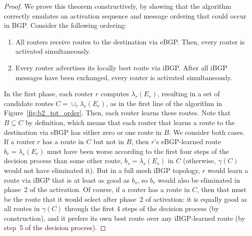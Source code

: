 \vspace*{0.1in}
\begin{proof}
We prove this theorem constructively, by showing that the algorithm
correctly emulates an activation sequence and message ordering that
could occur in BGP.  Consider the following ordering:
\begin{enumerate}
\itemsep=-1pt
\item All routers receive routes to the destination via eBGP.
Then, every router is activated simultaneously.
\item Every router advertises its locally best route via iBGP.  
  After all iBGP messages have been exchanged, every router is 
activated simultaneously.
\end{enumerate}

In the first phase, each router $r$ computes $\lambda_r(E_r)$, resulting
in a set of candidate routes $C = \cup_r \lambda_r(E_r)$, as in the
first line of the algorithm in Figure~\ref{fig:b2_tot_order}.  Then,
each router learns these routes.
Note that $B \subseteq C$ by definition, which means that each router
that learns a route to the destination via eBGP has either zero or one
route in $B$.  We consider both cases.
%
If a router $r$ has a route in $C$ but not in $B$, then $r$'s
eBGP-learned route $b_r=\lambda_r(E_r)$ must have been worse according to the first
four steps of the decision process than some other route, $b_s=\lambda_s(E_s)$ in $C$
(otherwise, $\gamma(C)$ would not have eliminated it).  But in a
full mesh iBGP topology, $r$ would learn
a route via iBGP that is at least as good as $b_s$, so $b_r$ would also be
eliminated in phase~2 of the activation.
%
Of course, if a router has a route in $C$, then that must be the route
that it would select after phase~2 of activation: it is equally good as
all routes in $\gamma(C)$ through the first 4 steps of the decision
process (by construction), and it prefers its own best route over any
iBGP-learned route (by step~5 of the decision process).
\end{proof}

